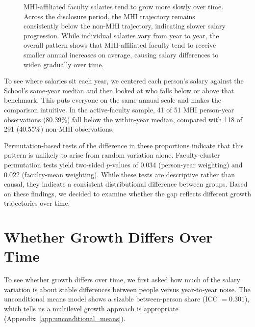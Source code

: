 \documentclass{article}
\begin{document}
{\begin{figure}[p]
\caption{MHI-affiliated faculty salaries tend to grow more slowly over time. Across the disclosure period, the MHI trajectory remains consistently below the non-MHI trajectory, indicating slower salary progression. While individual salaries vary from year to year, the overall pattern shows that MHI-affiliated faculty tend to receive smaller annual increases on average, causing salary differences to widen gradually over time.}
    \label{fig:salary_trajectories}
\end{figure}
}{}

\clearpage
To see where salaries sit each year, we centered each person’s salary against the School’s same‑year median and then looked at who falls below or above that benchmark. This puts everyone on the same annual scale and makes the comparison intuitive. In the active‑faculty sample, 41 of 51 MHI person‑year observations (80.39\%) fall below the within‑year median, compared with 118 of 291 (40.55\%) non‑MHI observations.

Permutation-based tests of the difference in these proportions indicate that this pattern is unlikely to arise from random variation alone. Faculty-cluster permutation tests yield two-sided \(p\)-values of 0.034 (person-year weighting) and 0.022 (faculty-mean weighting). While these tests are descriptive rather than causal, they indicate a consistent distributional difference between groups. Based on these findings, we decided to examine whether the gap reflects different growth trajectories over time.




\section*{Whether Growth Differs Over Time}

To see whether growth differs over time, we first asked how much of the salary variation is about stable differences between people versus year‑to‑year noise. The unconditional means model shows a sizable between‑person share (ICC \(= 0.301\)), which tells us a multilevel growth approach is appropriate (Appendix~\ref{app:unconditional_means}).
\end{document}

